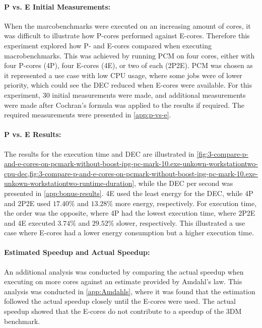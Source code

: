 

\paragraph{P vs. E Initial Measurements:} When the marcobenchmarks were executed on an increasing amount of cores, it was difficult to illustrate how P-cores performed against E-cores. Therefore this experiment explored how P- and E-cores compared when executing macrobenchmarks. This was achieved by running PCM on four cores, either with four P-cores (4P), four E-cores (4E), or two of each (2P2E). PCM was chosen as it represented a use case with low CPU usage, where some jobs were of lower priority, which could see the DEC reduced when E-cores were available. For this experiment, $30$ initial measurements were made, and additional measurements were made after Cochran's formula was applied to the results if required. The required measurements were presented in \cref{app:p-vs-e}.



\paragraph{P vs. E Results:} The results for the execution time and DEC are illustrated in \cref{fig:3-compare-p-and-e-cores-on-pcmark-without-boost-ipg-pc-mark-10.exe-unkown-workstationtwo-cpu-dec,fig:3-compare-p-and-e-cores-on-pcmark-without-boost-ipg-pc-mark-10.exe-unkown-workstationtwo-runtime-duration}, while the DEC per second was presented in \cref{app:bonus-results}. 4E used the least energy for the DEC, while 4P and 2P2E used $17.40\%$ and $13.28\%$ more energy, respectively. For execution time, the order was the opposite, where 4P had the lowest execution time, where 2P2E and 4E executed $3.74\%$ and $29.52\%$ slower, respectively. This illustrated a use case where E-cores had a lower energy consumption but a higher execution time.  


\paragraph{Estimated Speedup and Actual Speedup:}
An additional analysis was conducted by comparing the actual speedup when executing on more cores against an estimate provided by Amdahl's law. This analysis was conducted in \cref{app:Amdahls}, where it was found that the estimation followed the actual speedup closely until the E-cores were used. The actual speedup showed that the E-cores do not contribute to a speedup of the 3DM benchmark.


